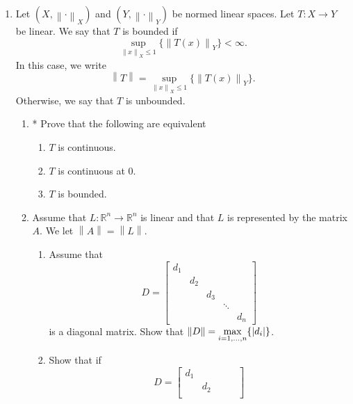 \documentclass[notoc,notitlepage]{tufte-book}
\newcommand{\norm}[1]{\left\| #1 \right\|}
\begin{document}
\begin{enumerate}
  \item Let $(X, \norm\cdot_X)$ and $(Y, \norm\cdot_Y)$ be normed linear spaces. Let $T : X \to Y$ be linear. We say that $T$ is bounded if
    \begin{equation*}
      \sup_{\norm{x}_X \leq 1} \{ \norm{ T(x) }_Y \} < \infty.
    \end{equation*}
    In this case, we write
    \begin{equation*}
      \norm{T} = \sup_{\norm{x}_X \leq 1} \{ \norm{T(x)}_Y \}.
    \end{equation*}
    Otherwise, we say that $T$ is unbounded.
    \begin{enumerate}
      \item * Prove that the following are equivalent
        \begin{enumerate}
          \item $T$ is continuous.
          \item $T$ is continuous at $0$.
          \item $T$ is bounded.
        \end{enumerate}
      \item Assume that $L : \mathbb{R}^n \to \mathbb{R}^n$ is linear and that $L$ is represented by the matrix $A$. We let $\norm{A} = \norm{L}$.
        \begin{enumerate}
          \item Assume that
            \begin{equation*}
              D = \begin{bmatrix}
                d_1  &     &     &        & \\
                     & d_2 &     &        & \\
                     &     & d_3 &        & \\
                     &     &     & \ddots & \\
                     &     &     &        & d_n
              \end{bmatrix}
            \end{equation*}
            is a diagonal matrix. Show that $\norm{D} = \max\limits_{i = 1, \ldots, n} \{ \abs{ d_i } \}$.
          \item Show that if
            \begin{equation*}
              D = \begin{bmatrix}
                d_1  &     &     &        & \\
                     & d_2 &     &        & \\

\end{bmatrix}
\end{equation*}
\end{enumerate}
\end{enumerate}
\end{enumerate}
\end{document}

